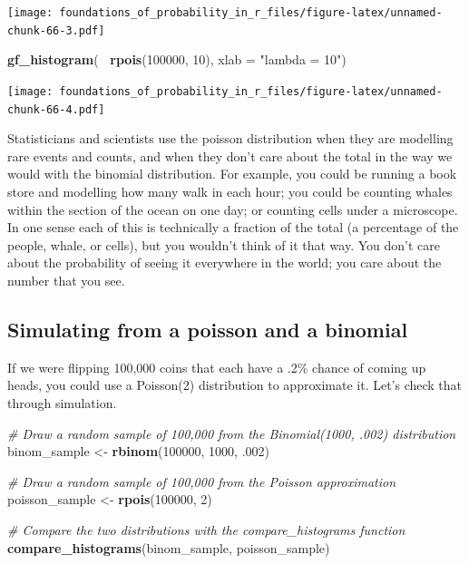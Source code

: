 \documentclass[]{article}
\newenvironment{Shaded}{\begin{snugshade}}{\end{snugshade}}
\newcommand{\CommentTok}[1]{\textcolor[rgb]{0.56,0.35,0.01}{\textit{#1}}}
\newcommand{\DataTypeTok}[1]{\textcolor[rgb]{0.13,0.29,0.53}{#1}}
\newcommand{\DecValTok}[1]{\textcolor[rgb]{0.00,0.00,0.81}{#1}}
\newcommand{\FloatTok}[1]{\textcolor[rgb]{0.00,0.00,0.81}{#1}}
\newcommand{\KeywordTok}[1]{\textcolor[rgb]{0.13,0.29,0.53}{\textbf{#1}}}
\newcommand{\NormalTok}[1]{#1}
\newcommand{\OperatorTok}[1]{\textcolor[rgb]{0.81,0.36,0.00}{\textbf{#1}}}
\newcommand{\StringTok}[1]{\textcolor[rgb]{0.31,0.60,0.02}{#1}}
\begin{document}
\texttt{[image: foundations\_of\_probability\_in\_r\_files/figure-latex/unnamed-chunk-66-3.pdf]}

\begin{Shaded}
\begin{Highlighting}[]
\KeywordTok{gf_histogram}\NormalTok{(}\OperatorTok{~}\StringTok{ }\KeywordTok{rpois}\NormalTok{(}\DecValTok{100000}\NormalTok{, }\DecValTok{10}\NormalTok{), }\DataTypeTok{xlab =} \StringTok{"lambda = 10"}\NormalTok{)}
\end{Highlighting}
\end{Shaded}

\texttt{[image: foundations\_of\_probability\_in\_r\_files/figure-latex/unnamed-chunk-66-4.pdf]}

Statisticians and scientists use the poisson distribution when they are
modelling rare events and counts, and when they don't care about the
total in the way we would with the binomial distribution. For example,
you could be running a book store and modelling how many walk in each
hour; you could be counting whales within the section of the ocean on
one day; or counting cells under a microscope. In one sense each of this
is technically a fraction of the total (a percentage of the people,
whale, or cells), but you wouldn't think of it that way. You don't care
about the probability of seeing it everywhere in the world; you care
about the number that you see.

\hypertarget{simulating-from-a-poisson-and-a-binomial}{%
\subsection{Simulating from a poisson and a
binomial}\label{simulating-from-a-poisson-and-a-binomial}}

If we were flipping 100,000 coins that each have a .2\% chance of coming
up heads, you could use a Poisson(2) distribution to approximate it.
Let's check that through simulation.

\begin{Shaded}
\begin{Highlighting}[]
\CommentTok{# Draw a random sample of 100,000 from the Binomial(1000, .002) distribution}
\NormalTok{binom_sample <-}\StringTok{ }\KeywordTok{rbinom}\NormalTok{(}\DecValTok{100000}\NormalTok{, }\DecValTok{1000}\NormalTok{, }\FloatTok{.002}\NormalTok{)}

\CommentTok{# Draw a random sample of 100,000 from the Poisson approximation}
\NormalTok{poisson_sample <-}\StringTok{ }\KeywordTok{rpois}\NormalTok{(}\DecValTok{100000}\NormalTok{, }\DecValTok{2}\NormalTok{)}

\CommentTok{# Compare the two distributions with the compare_histograms function}
\KeywordTok{compare_histograms}\NormalTok{(binom_sample, poisson_sample)}
\end{Highlighting}
\end{Shaded}
\end{document}
